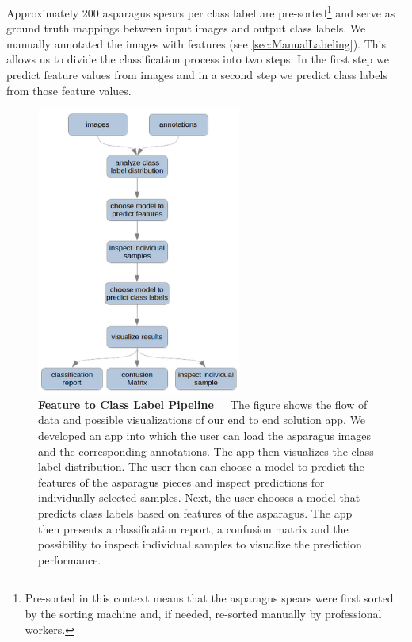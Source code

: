 Approximately 200 asparagus spears per class label are pre-sorted\footnote{Pre-sorted in this context means that the asparagus spears were first sorted by the sorting machine and, if needed, re-sorted manually by professional workers.} and serve as ground truth mappings between input images and output class labels. We manually annotated the images with features (see \autoref{sec:ManualLabeling}). This allows us to divide the classification process into two steps: In the first step we predict feature values from images and in a second step we predict class labels from those feature values.

\begin{figure}[!htb]
	\centering
	\includegraphics[width=0.60\textwidth]{Figures/chapter04/ftl_pipeline.png}
	\decoRule
	\caption[Feature to Class Label Pipeline]{\textbf{Feature to Class Label Pipeline}~~~The figure shows the flow of data and possible visualizations of our end to end solution app. We developed an app into which the user can load the asparagus images and the corresponding annotations. The app then visualizes the class label distribution. The user then can choose a model to predict the features of the asparagus pieces and inspect predictions for individually selected samples. Next, the user chooses a model that predicts class labels based on features of the asparagus. The app then presents a classification report, a confusion matrix and the possibility to inspect individual samples to visualize the prediction performance.}
	\label{fig:FeatureEngineeringNetStructure}
\end{figure}

